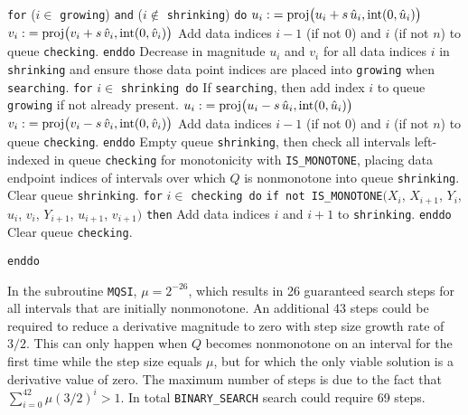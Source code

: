 {\itemitem{} {\tt for} ($i \in$ {\tt growing}) {\tt and} ($i \not\in$
{\tt shrinking}) {\tt do}
\itemitem{} \codent $u_i \: \hbox{proj}\bigl(u_i + s\,\hat u_i, \hbox{int}
  (0,\hat u_i)\bigr)$
\itemitem{} \codent $v_i \: \hbox{proj}\bigl(v_i + s\,\hat v_i, \hbox{int}
  (0,\hat v_i)\bigr)$
\itemitem{} \codent Add data indices $i-1$ (if not 0) and $i$ (if not $n$) to queue
  {\tt checking}.
\itemitem{} {\tt enddo}
\itemitem{} Decrease in magnitude $u_i$ and $v_i$ for all data indices
  $i$ in {\tt shrinking} and ensure those data point indices are placed
  into {\tt growing} when {\tt searching}.
\itemitem{} {\tt for} $i \in$ {\tt shrinking do}
\itemitem{} \codent If {\tt searching}, then add index $i$ to queue
  {\tt growing} if not already present.
\itemitem{} \codent $u_i \: \hbox{proj}\bigl(u_i - s\,\hat u_i, \hbox{int}
  (0,\hat u_i)\bigr)$
\itemitem{} \codent $v_i \: \hbox{proj}\bigl(v_i - s\,\hat v_i, \hbox{int}
  (0,\hat v_i)\bigr)$
\itemitem{} \codent Add data indices $i-1$ (if not 0) and $i$ (if not $n$) to queue
  {\tt checking}.
\itemitem{} {\tt enddo}
\itemitem{} Empty queue {\tt shrinking}, then check all intervals left-indexed
  in queue {\tt checking} for monotonicity with {\tt IS\_MONOTONE},
  placing data endpoint indices of intervals over which $Q$ is nonmonotone
  into queue {\tt shrinking}.
\itemitem{} Clear queue {\tt shrinking}.
\itemitem{} {\tt for} $i \in$ {\tt checking do}
\itemitem{} \codent
  {\tt if not IS\_MONOTONE}$\bigl( X_i$, $X_{i+1}$, $Y_i$, $u_i$,
  $v_i$, $Y_{i+1}$, $u_{i+1}$, $v_{i+1} \bigr)$ {\tt then}
\itemitem{} \codent \codent Add data indices $i$ and $i+1$ to {\tt shrinking}.
\itemitem{} 
\itemitem{} {\tt enddo}
\itemitem{} Clear queue {\tt checking}.
\item{} {\tt enddo }
}
\vskip 5mm



In the subroutine {\tt MQSI}, $\mu = 2^{-26}$, which results in 26
guaranteed search steps for all intervals that are initially
nonmonotone. An additional 43 steps could be required to reduce a
derivative magnitude to zero with step size growth rate of $3/2$. This
can only happen when $Q$ becomes nonmonotone on an interval for the
first time while the step size equals $\mu$, but for which the only
viable solution is a derivative value of zero. The maximum number of
steps is due to the fact that $\sum_{i=0}^{42} \mu (3/2)^i > 1$. In
total {\tt BINARY\_SEARCH} search could require 69 steps.
